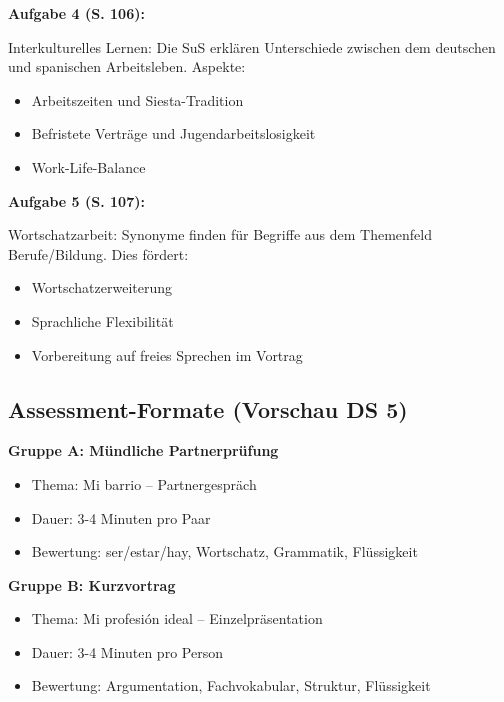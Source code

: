 \documentclass[11pt, a4paper]{article}
\begin{document}
\textbf{Aufgabe 4 (S. 106):}

Interkulturelles Lernen: Die SuS erklären Unterschiede zwischen dem deutschen und spanischen Arbeitsleben. Aspekte:
\begin{itemize}[leftmargin=2em]
    \item Arbeitszeiten und Siesta-Tradition
    \item Befristete Verträge und Jugendarbeitslosigkeit
    \item Work-Life-Balance
\end{itemize}

\textbf{Aufgabe 5 (S. 107):}

Wortschatzarbeit: Synonyme finden für Begriffe aus dem Themenfeld Berufe/Bildung. Dies fördert:
\begin{itemize}[leftmargin=2em]
    \item Wortschatzerweiterung
    \item Sprachliche Flexibilität
    \item Vorbereitung auf freies Sprechen im Vortrag
\end{itemize}

\subsection{Assessment-Formate (Vorschau DS 5)}

\textbf{Gruppe A: Mündliche Partnerprüfung}
\begin{itemize}[leftmargin=2em]
    \item Thema: \glqq{}Mi barrio\grqq{} -- Partnergespräch
    \item Dauer: 3-4 Minuten pro Paar
    \item Bewertung: ser/estar/hay, Wortschatz, Grammatik, Flüssigkeit
\end{itemize}

\textbf{Gruppe B: Kurzvortrag}
\begin{itemize}[leftmargin=2em]
    \item Thema: \glqq{}Mi profesión ideal\grqq{} -- Einzelpräsentation
    \item Dauer: 3-4 Minuten pro Person
    \item Bewertung: Argumentation, Fachvokabular, Struktur, Flüssigkeit
\end{itemize}

\end{document}
